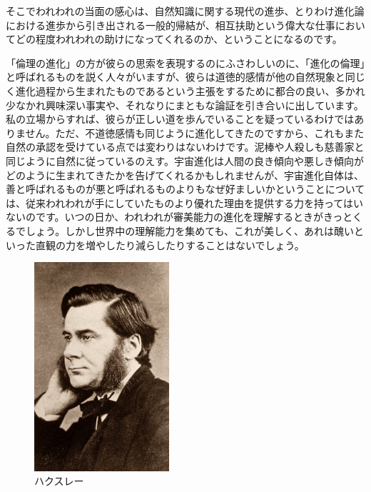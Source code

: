 そこでわれわれの当面の感心は、自然知識に関する現代の進歩、とりわけ進化論における進歩から引き出される一般的帰結が、相互扶助という偉大な仕事においてどの程度われわれの助けになってくれるのか、ということになるのです。

「倫理の進化」の方が彼らの思索を表現するのにふさわしいのに、「進化の倫理」と呼ばれるものを説く人々がいますが、彼らは道徳的感情が他の自然現象と同じく進化過程から生まれたものであるという主張をするために都合の良い、多かれ少なかれ興味深い事実や、それなりにまともな論証を引き合いに出しています。私の立場からすれば、彼らが正しい道を歩んでいることを疑っているわけではありません。ただ、不道徳感情も同じように進化してきたのですから、これもまた自然の承認を受けている点では変わりはないわけです。泥棒や人殺しも慈善家と同じように自然に従っているのえす。宇宙進化は人間の良き傾向や悪しき傾向がどのように生まれてきたかを告げてくれるかもしれませんが、宇宙進化自体は、善と呼ばれるものが悪と呼ばれるものよりもなぜ好ましいかということについては、従来われわれが手にしていたものより優れた理由を提供する力を持ってはいないのです。いつの日か、われわれが審美能力の進化を理解するときがきっとくるでしょう。しかし世界中の理解能力を集めても、これが美しく、あれは醜いといった直観の力を増やしたり減らしたりすることはないでしょう。

  \begin{figure}[htbp]
    \centering
      \includegraphics[width=50mm]{images/huxley.jpg}
    \caption{ハクスレー}
  \end{figure}


